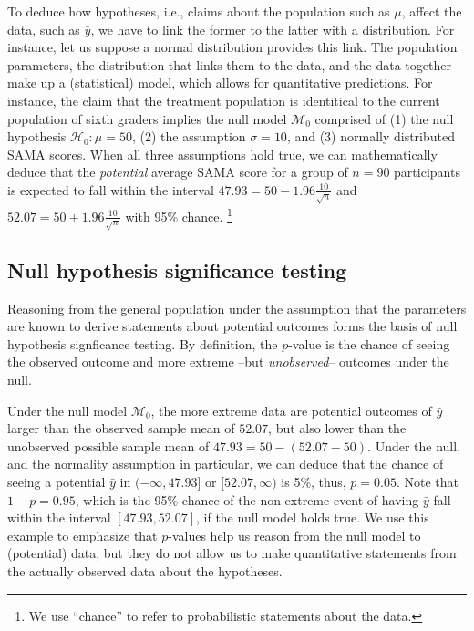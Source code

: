 \documentclass[english,,doc,floatsintext]{apa6}
\let\rmarkdownfootnote\footnote%
\def\footnote{\protect\rmarkdownfootnote}
\begin{document}
To deduce how hypotheses, i.e., claims about the population such as \(\mu\), affect the data, such as \(\bar{y}\), we have to link the former to the latter with a distribution. For instance, let us suppose a normal distribution provides this link. The population parameters, the distribution that links them to the data, and the data together make up a (statistical) model, which allows for quantitative predictions. For instance, the claim that the treatment population is identitical to the current population of sixth graders implies the null model \(\mathcal{M}_{0}\) comprised of (1) the null hypothesis \(\mathcal{H}_{0}: \mu = 50\), (2) the assumption \(\sigma = 10\), and (3) normally distributed SAMA scores. When all three assumptions hold true, we can mathematically deduce that the \emph{potential} average SAMA score for a group of \(n = 90\) participants is expected to fall within the interval \(47.93 = 50 - 1.96 \frac{10}{\sqrt{n}}\) and \(52.07 = 50 + 1.96 \frac{10}{\sqrt{n}}\) with 95\% chance.
\footnote{We use ``chance'' to refer to probabilistic statements about the data.}

\subsection{Null hypothesis significance testing}

Reasoning from the general population under the assumption that the parameters are known to derive statements about potential outcomes forms the basis of null hypothesis signficance testing. By definition, the \(p\)-value is the chance of seeing the observed outcome and more extreme --but \emph{unobserved}-- outcomes under the null.

Under the null model \(\mathcal{M}_{0}\), the more extreme data are potential outcomes of \(\bar{y}\) larger than the observed sample mean of \(52.07\), but also lower than the unobserved possible sample mean of \(47.93 = 50 - (52.07-50)\). Under the null, and the normality assumption in particular, we can deduce that the chance of seeing a potential \(\bar{y}\) in \((- \infty, 47.93]\) or \([52.07, \infty)\) is 5\%, thus, \(p=0.05\). Note that \(1 - p = 0.95\), which is the 95\% chance of the non-extreme event of having \(\bar{y}\) fall within the interval \([47.93, 52.07]\), if the null model holds true. We use this example to emphasize that \(p\)-values help us reason from the null model to (potential) data, but they do not allow us to make quantitative statements from the actually observed data about the hypotheses.
\end{document}
